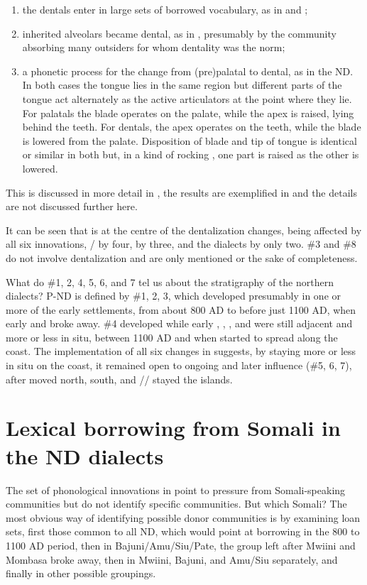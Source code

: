 \documentclass[output=paper
,newtxmath
,modfonts
,nonflat]{langsci/langscibook}
\begin{document}
\begin{enumerate}
	
\item the dentals enter in large sets of borrowed vocabulary, as in  and ;
\item inherited alveolars became dental, as in , presumably by the community absorbing many outsiders for whom dentality was the norm; 
\item a phonetic process for the change from (pre)palatal to dental, as in the ND. In both cases the tongue lies in the same region but different parts of the tongue act alternately as the active articulators at the point where they lie. For palatals the blade operates on the palate, while the apex is raised, lying behind the teeth. For dentals, the apex operates on the teeth, while the blade is lowered from the palate. Disposition of blade and tip of tongue is identical or similar in both but, in a kind of rocking , one part is raised as the other is lowered.   

\end{enumerate}


This is discussed in more detail in \citealt{Nurse1985}, the results are exemplified in \citet[572-575]{Nurse1993} and the details are not discussed further here. 

 It can be seen that  is at the centre of the dentalization changes, being affected by all six innovations, / by four,  by three,  and the  dialects by only two. \#3 and \#8 do not involve dentalization and are only mentioned or the sake of completeness. 

  What do \#1, 2, 4, 5, 6, and 7 tel us about the stratigraphy of the northern dialects? P-ND is defined by \#1, 2, 3, which developed presumably in one or more of the early settlements, from about 800 AD to before just 1100 AD, when early  and  broke away. \#4 developed while early , , , and  were still adjacent and more or less in situ, between 1100 AD and when  started to spread along the coast. The implementation of all six changes in  suggests, by staying more or less in situ on the coast, it remained open to ongoing and later  influence (\#5, 6, 7), after  moved north,  south, and // stayed the islands. 

\section{Lexical borrowing from Somali in the ND dialects}\label{sec:nurse:5} The set of phonological innovations in  point to pressure from Somali-speaking communities but do not identify specific communities. But which Somali? The most obvious way of identifying possible donor communities is by examining loan sets, first those common to all ND, which would point at borrowing in the 800 to 1100 AD period, then in Bajuni/Amu/Siu/Pate, the group left after Mwiini and Mombasa broke away, then in Mwiini, Bajuni, and Amu/Siu separately, and finally in other possible groupings.
\end{document}
